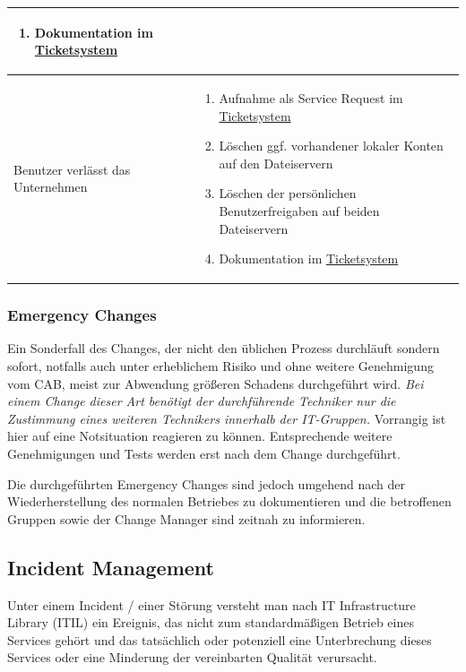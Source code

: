 \documentclass[]{article}
\begin{document}
\begin{longtable}{p{3cm}|p{10cm}}
\begin{enumerate}
\item
  Dokumentation im
  \href{https://docs.google.com/spreadsheets/d/1GDq3AEsVDu1a-X7tEl6qKDtSZdAXm8lsRzY6Ijw-dUQ/edit\#gid=0}{Ticketsystem}
\end{enumerate}\tabularnewline
\midrule
Benutzer verlässt das Unternehmen & \begin{enumerate}
\def\labelenumi{\arabic{enumi}.}
\item
  Aufnahme als Service Request im
  \href{https://docs.google.com/spreadsheets/d/1GDq3AEsVDu1a-X7tEl6qKDtSZdAXm8lsRzY6Ijw-dUQ/edit\#gid=0}{Ticketsystem}
\item
  Löschen ggf. vorhandener lokaler Konten auf den Dateiservern
\item
  Löschen der persönlichen Benutzerfreigaben auf beiden Dateiservern
\item
  Dokumentation im
  \href{https://docs.google.com/spreadsheets/d/1GDq3AEsVDu1a-X7tEl6qKDtSZdAXm8lsRzY6Ijw-dUQ/edit\#gid=0}{Ticketsystem}
\end{enumerate}\tabularnewline
\bottomrule
\end{longtable}

\subsubsection{Emergency Changes}\label{emergency-changes}

Ein Sonderfall des Changes, der nicht den üblichen Prozess durchläuft
sondern sofort, notfalls auch unter erheblichem Risiko und ohne weitere
Genehmigung vom CAB, meist zur Abwendung größeren Schadens durchgeführt
wird. \emph{Bei einem Change dieser Art benötigt der durchführende
Techniker nur die Zustimmung eines weiteren Technikers innerhalb der
IT-Gruppen.} Vorrangig ist hier auf eine Notsituation reagieren zu
können. Entsprechende weitere Genehmigungen und Tests werden erst nach
dem Change durchgeführt.

Die durchgeführten Emergency Changes sind jedoch umgehend nach der
Wiederherstellung des normalen Betriebes zu dokumentieren und die
betroffenen Gruppen sowie der Change Manager sind zeitnah zu
informieren.

\subsection{Incident Management}\label{incident-management}

Unter einem Incident / einer Störung versteht man nach IT Infrastructure
Library (ITIL) ein Ereignis, das nicht zum standardmäßigen Betrieb eines
Services gehört und das tatsächlich oder potenziell eine Unterbrechung
dieses Services oder eine Minderung der vereinbarten Qualität
verursacht.
\end{document}
